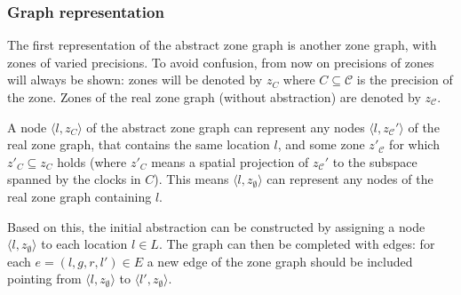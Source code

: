 


\subsubsection{Graph representation}

The first representation of the abstract zone graph is another zone graph, with zones of varied precisions. To avoid confusion, from now on precisions of zones will always be shown: zones will be denoted by $z_{C}$ where $C \subseteq \mathcal{C}$ is the precision of the zone. Zones of the real zone graph (without abstraction) are denoted by $z_{\mathcal{C}}$.

A node $\langle l, z_{C} \rangle$ of the abstract zone graph can represent any nodes $\langle l, z_{\mathcal{C}}' \rangle$ of the real zone graph, that contains the same location $l$, and some zone $z'_{\mathcal{C}}$ for which $z'_C \subseteq z_C$ holds (where $z'_C$ means a spatial projection of $z_{\mathcal{C}}'$ to the subspace spanned by the clocks in $C$). This means $\langle l, z_{\emptyset} \rangle$ can represent any nodes of the real zone graph containing $l$. 

Based on this, the initial abstraction can be constructed by assigning a node $\langle l, z_{\emptyset} \rangle$ to each location $l \in L$. The graph can then be completed with edges: for each $e=(l,g,r,l') \in E$ a new edge of the zone graph should be included pointing from $\langle l, z_{\emptyset} \rangle$ to $\langle l', z_{\emptyset} \rangle$.

